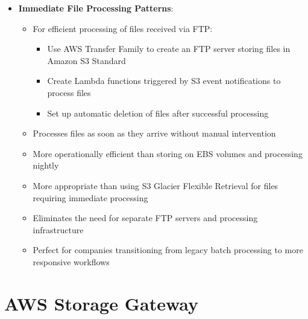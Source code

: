 \documentclass[11pt,a4paper]{report}
\begin{document}
\begin{itemize}
\begin{itemize}
\begin{itemize}
\end{itemize}
  \item Provides fully managed SFTP service that scales automatically with demand
  \item Leverages existing on-premises Active Directory for user authentication
  \item Requires no changes to customer applications that use SFTP clients
  \item More appropriate than AWS DMS or DataSync for file transfer workflows
  \item More operational efficient than setting up and managing SFTP servers on EC2 instances
  \item Eliminates need to manage server infrastructure, patching, or scaling
\end{itemize}
  \item \textbf{Immediate File Processing Patterns}:
\begin{itemize}
  \item For efficient processing of files received via FTP:
\begin{itemize}
  \item Use AWS Transfer Family to create an FTP server storing files in Amazon S3 Standard
  \item Create Lambda functions triggered by S3 event notifications to process files
  \item Set up automatic deletion of files after successful processing
\end{itemize}
  \item Processes files as soon as they arrive without manual intervention
  \item More operationally efficient than storing on EBS volumes and processing nightly
  \item More appropriate than using S3 Glacier Flexible Retrieval for files requiring immediate processing
  \item Eliminates the need for separate FTP servers and processing infrastructure
  \item Perfect for companies transitioning from legacy batch processing to more responsive workflows
\end{itemize}
\end{itemize}


\section{AWS Storage Gateway}
\end{document}

